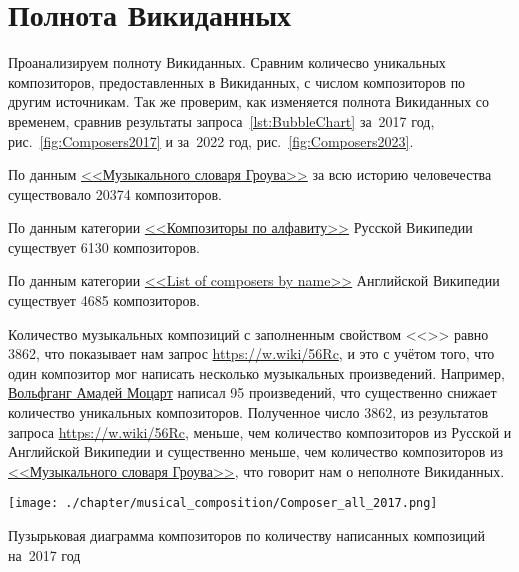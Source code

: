 \section{Полнота Викиданных}
Проанализируем полноту Викиданных. Сравним количесво уникальных композиторов, предоставленных в Викиданных, с числом композиторов по другим источникам. Так же проверим, как изменяется полнота Викиданных со временем, сравнив результаты запроса~\ref{lst:BubbleChart} за~2017 год, рис.~\ref{fig:Composers2017} и за~2022 год, рис.~\ref{fig:Composers2023}.

По данным \href{https://ru.wikipedia.org/wiki/Музыкальный_словарь_Гроува}{<<Музыкального словаря Гроува>>} за всю историю человечества существовало \num{20374} композиторов.


По данным категории \href{https://ru.wikipedia.org/wiki/Категория:Композиторы_по_алфавиту}{<<Композиторы по алфавиту>>} Русской Википедии существует \num{6130} композиторов.


По данным категории \href{https://en.wikipedia.org/wiki/List_of_composers_by_name}{<<List of composers by name>>} Английской Википедии существует \num{4685} композиторов.


Количество музыкальных композиций с заполненным свойством <<>> равно \num{3862}, что показывает нам запрос \href{https://w.wiki/56Rc}{https://w.wiki/56Rc}, и это с учётом того, что один композитор мог написать несколько музыкальных произведений. Например, \href{https://ru.wikipedia.org/wiki/Моцарт,_Вольфганг_Амадей}{Вольфганг Амадей Моцарт} написал \num{95} произведений, что существенно снижает количество уникальных композиторов. Полученное число \num{3862}, из результатов запроса \href{https://w.wiki/56Rc}{https://w.wiki/56Rc}, меньше, чем количество композиторов из Русской и Английской Википедии и существенно меньше, чем количество композиторов из \href{https://ru.wikipedia.org/wiki/Музыкальный_словарь_Гроува}{<<Музыкального словаря Гроува>>}, что говорит нам о неполноте Викиданных.

\begin{marginfigure}[1\baselineskip]
  \texttt{[image: ./chapter/musical\_composition/Composer\_all\_2017.png]}
  \vspace{-7pt}
  \caption[Пузырьковая диаграмма композиторов по количеству написанных композиций на~2017 год]{Пузырьковая диаграмма композиторов по количеству написанных композиций на~2017 год}%
  \label{fig:Composers2017}%
\end{marginfigure}


